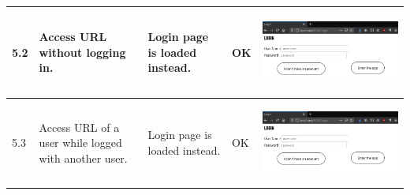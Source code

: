 \documentclass[12pt,twoside,titlepage,a4paper]{article}
\theoremstyle{definicion}
\theoremstyle{lema}
\theoremstyle{teorema}
\theoremstyle{corolario}
\theoremstyle{ejemplo}
\theoremstyle{nota}
\begin{document}
\begin{table}[!h]
\begin{tabular}{|m{0.6cm}|m{2.9cm}|m{3.6cm}|m{1.1cm}|m{5.9cm}|}
		\hline
		5.2 & Access URL without logging in. & Login page is loaded instead. & OK &
		\begin{center}\includegraphics[scale=0.22]{register2-login1.png}\end{center} \\
		\hline
		5.3 & Access URL of a user while logged with another user. & Login page is loaded instead. & OK &
		\begin{center}\includegraphics[scale=0.22]{register2-login1.png}\end{center} \\
		\hline
	\end{tabular}
\end{table}
\newpage
\end{document}
